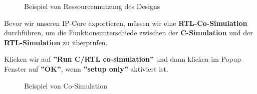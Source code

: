 \documentclass[a4paper]{report}
\begin{document}
\begin{figure}[H]
\centering
{}
\caption{Beispiel von Ressourcennutzung des Designs}
\label{fig:Ressourcennutzung_des_Designs}
\end{figure}


Bevor wir unseren IP-Core exportieren, müssen wir eine \textbf{RTL-Co-Simulation} durchführen, um die Funktionsunterschiede zwischen der \textbf{C-Simulation} und der \textbf{RTL-Simulation} zu überprüfen.

Klicken wir auf \textbf{''Run C/RTL co-simulation''} und dann klicken im Popup-Fenster auf \textbf{''OK''}, wenn \textbf{''setup only''} aktiviert ist.\\

\begin{figure}[H]
\centering
{}
\caption{Beispiel von Co-Simulation}
\label{fig:Co_-_Simulation}
\end{figure}
\end{document}
